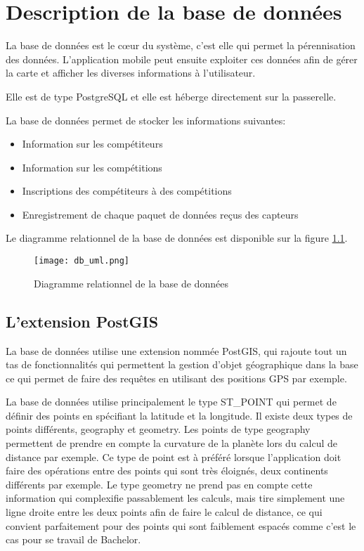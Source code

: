 
\chapter{Description de la base de données}\label{ch:bd}

La base de données est le cœur du système, c'est elle qui permet la pérennisation des données. L'application mobile peut ensuite exploiter ces données afin de gérer la carte et afficher les diverses informations à l'utilisateur.

Elle est de type PostgreSQL et elle est héberge directement sur la passerelle.

La base de données permet de stocker les informations suivantes:

\begin{itemize}
\item Information sur les compétiteurs
\item Information sur les compétitions
\item Inscriptions des compétiteurs à des compétitions
\item Enregistrement de chaque paquet de données reçus des capteurs
\end{itemize}

Le diagramme relationnel de la base de données est disponible sur la figure \ref{fig:db_uml}.

\begin{figure}[htb]
\centering 
\texttt{[image: db\_uml.png]} 
\caption{Diagramme relationnel de la base de données}
\label{fig:db_uml}
 \end{figure}

\section{L'extension PostGIS}


La base de données utilise une extension nommée PostGIS, qui rajoute tout un tas de fonctionnalités qui permettent la gestion d'objet géographique dans la base ce qui permet de faire des requêtes en utilisant des positions GPS par exemple.

La base de données utilise principalement le type ST\_POINT qui permet de définir des points en spécifiant la latitude et la longitude. Il existe deux types de points différents, geography et geometry. Les points de type geography permettent de prendre en compte la curvature de la planète lors du calcul de distance par exemple. Ce type de point est à préféré lorsque l'application doit faire des opérations entre des points qui sont très éloignés, deux continents différents par exemple. Le type geometry ne prend pas en compte cette information qui complexifie passablement les calculs, mais tire simplement une ligne droite entre les deux points afin de faire le calcul de distance, ce qui convient parfaitement pour des points qui sont faiblement espacés comme c'est le cas pour se travail de Bachelor.

